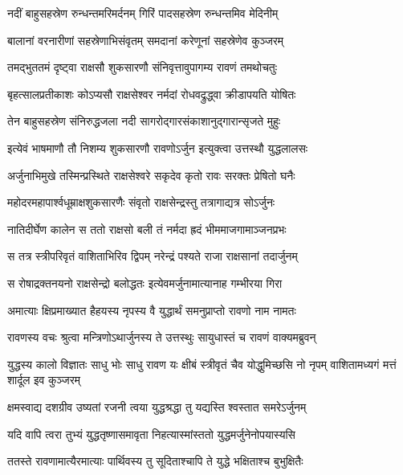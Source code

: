 \twolineshloka
{नदीं बाहुसहस्रेण रुन्धन्तमरिमर्दनम्}
{गिरिं पादसहस्रेण रुन्धन्तमिव मेदिनीम्} %

\twolineshloka
{बालानां वरनारीणां सहस्रेणाभिसंवृतम्}
{समदानां करेणूनां सहस्रेणेव कुञ्जरम्} %

\twolineshloka
{तमद्भुततमं दृष्ट्वा राक्षसौ शुकसारणौ}
{संनिवृत्तावुपागम्य रावणं तमथोचतुः} %

\twolineshloka
{बृहत्सालप्रतीकाशः कोऽप्यसौ राक्षसेश्वर}
{नर्मदां रोधवद्रुद्ध्वा क्रीडापयति योषितः} %

\twolineshloka
{तेन बाहुसहस्रेण संनिरुद्धजला नदी}
{सागरोद्गारसंकाशानुद्गारान्सृजते मुहुः} %

\twolineshloka
{इत्येवं भाषमाणौ तौ निशम्य शुकसारणौ}
{रावणोऽर्जुन इत्युक्त्वा उत्तस्थौ युद्धलालसः} %

\twolineshloka
{अर्जुनाभिमुखे तस्मिन्प्रस्थिते राक्षसेश्वरे}
{सकृदेव कृतो रावः सरक्तः प्रेषितो घनैः} %

\twolineshloka
{महोदरमहापार्श्वधूम्राक्षशुकसारणैः}
{संवृतो राक्षसेन्द्रस्तु तत्रागाद्यत्र सोऽर्जुनः} %

\twolineshloka
{नातिदीर्घेण कालेन स ततो राक्षसो बली}
{तं नर्मदा ह्रदं भीममाजगामाञ्जनप्रभः} %

\twolineshloka
{स तत्र स्त्रीपरिवृतं वाशिताभिरिव द्विपम्}
{नरेन्द्रं पश्यते राजा राक्षसानां तदार्जुनम्} %

\twolineshloka
{स रोषाद्रक्तनयनो राक्षसेन्द्रो बलोद्धतः}
{इत्येवमर्जुनामात्यानाह गम्भीरया गिरा} %

\twolineshloka
{अमात्याः क्षिप्रमाख्यात हैहयस्य नृपस्य वै}
{युद्धार्थं समनुप्राप्तो रावणो नाम नामतः} %

\twolineshloka
{रावणस्य वचः श्रुत्वा मन्त्रिणोऽथार्जुनस्य ते}
{उत्तस्थुः सायुधास्तं च रावणं वाक्यमब्रुवन्} %

\threelineshloka
{युद्धस्य कालो विज्ञातः साधु भोः साधु रावण}
{यः क्षीबं स्त्रीवृतं चैव योद्धुमिच्छसि नो नृपम्}
{वाशितामध्यगं मत्तं शार्दूल इव कुञ्जरम्} %

\twolineshloka
{क्षमस्वाद्य दशग्रीव उष्यतां रजनी त्वया}
{युद्धश्रद्धा तु यद्यस्ति श्वस्तात समरेऽर्जुनम्} %

\twolineshloka
{यदि वापि त्वरा तुभ्यं युद्धतृष्णासमावृता}
{निहत्यास्मांस्ततो युद्धमर्जुनेनोपयास्यसि} %

\twolineshloka
{ततस्ते रावणामात्यैरमात्याः पार्थिवस्य तु}
{सूदिताश्चापि ते युद्धे भक्षिताश्च बुभुक्षितैः} %


